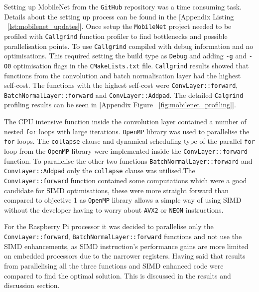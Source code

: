 Setting up MobileNet from the \texttt{GitHub} repository\cite{mobilenet_repo} was a time consuming task. Details about the setting up process can be found in the [Appendix Listing ~\ref{lst:mobilenet_updates}]. Once setup the \texttt{MobileNet} project needed to be profiled with \texttt{Callgrind} function profiler to find bottlenecks and possible parallelisation points. To use \texttt{Callgrind} compiled with debug information and no optimisations. This required setting the build type as \texttt{Debug} and adding \texttt{-g} and \texttt{-O0} optimisation flags in the \texttt{CMakeLists.txt} file. \texttt{Callgrind} results showed that functions from the convolution and batch normalisation layer had the highest self-cost. The functions with the highest self-cost were \texttt{ConvLayer::forward}, \texttt{BatchNormalLayer::forward} and \texttt{ConvLayer::Addpad}. The detailed \texttt{Calgrind} profiling results can be seen in [Appendix Figure ~\ref{fig:mobilenet_profiling}]. 

The CPU intensive function inside the convolution layer contained a number of nested \texttt{for} loops with large iterations. \texttt{OpenMP} library was used to parallelise the \texttt{for} loops. The \texttt{collapse} clause and dynamical scheduling type of the parallel \texttt{for} loop from the \texttt{OpenMP} library were implemented inside the \texttt{ConvLayer::forward} function. To parallelise the other two functions \texttt{BatchNormalLayer::forward} and \texttt{ConvLayer::Addpad} only the \texttt{collapse} clause was utilised.The \texttt{ConvLayer::forward} function contained some computations which were a good candidate for SIMD optimisations, these were more straight forward than compared to objective 1 as \texttt{OpenMP} library allows a simple way of using SIMD without the developer having to worry about \texttt{AVX2} or \texttt{NEON} instructions. 

For the Raspberry Pi processor it was decided to parallelise only the \texttt{ConvLayer::forward}, \texttt{BatchNormalLayer::forward} functions and not use the SIMD enhancements, as SIMD instruction's performance gains are more limited on embedded processors due to the narrower registers\cite{embedded_processors_reduced_simd_performance}. Having said that results from parallelising all the three functions and SIMD enhanced code were compared to find the optimal solution. This is discussed in the results and discussion section. 

